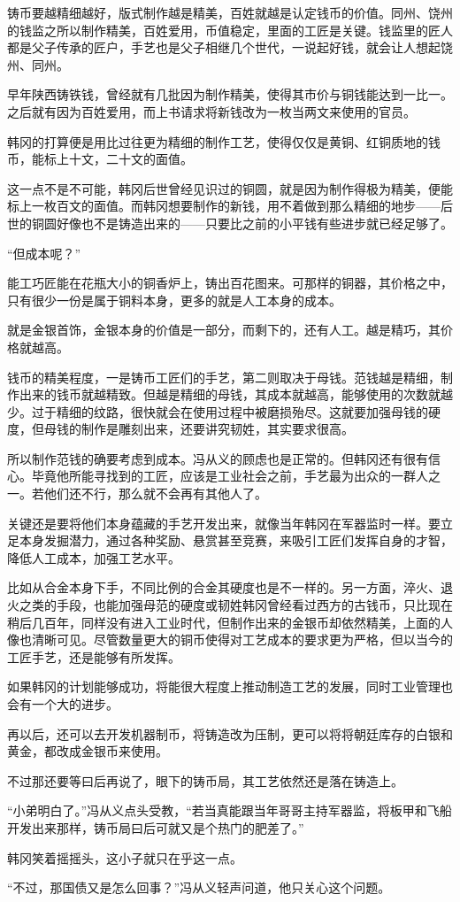 铸币要越精细越好，版式制作越是精美，百姓就越是认定钱币的价值。同州、饶州的钱监之所以制作精美，百姓爱用，币值稳定，里面的工匠是关键。钱监里的匠人都是父子传承的匠户，手艺也是父子相继几个世代，一说起好钱，就会让人想起饶州、同州。

早年陕西铸铁钱，曾经就有几批因为制作精美，使得其市价与铜钱能达到一比一。之后就有因为百姓爱用，而上书请求将新钱改为一枚当两文来使用的官员。

韩冈的打算便是用比过往更为精细的制作工艺，使得仅仅是黄铜、红铜质地的钱币，能标上十文，二十文的面值。

这一点不是不可能，韩冈后世曾经见识过的铜圆，就是因为制作得极为精美，便能标上一枚百文的面值。而韩冈想要制作的新钱，用不着做到那么精细的地步——后世的铜圆好像也不是铸造出来的——只要比之前的小平钱有些进步就已经足够了。

“但成本呢？”

能工巧匠能在花瓶大小的铜香炉上，铸出百花图来。可那样的铜器，其价格之中，只有很少一份是属于铜料本身，更多的就是人工本身的成本。

就是金银首饰，金银本身的价值是一部分，而剩下的，还有人工。越是精巧，其价格就越高。

钱币的精美程度，一是铸币工匠们的手艺，第二则取决于母钱。范钱越是精细，制作出来的钱币就越精致。但越是精细的母钱，其成本就越高，能够使用的次数就越少。过于精细的纹路，很快就会在使用过程中被磨损殆尽。这就要加强母钱的硬度，但母钱的制作是雕刻出来，还要讲究韧姓，其实要求很高。

所以制作范钱的确要考虑到成本。冯从义的顾虑也是正常的。但韩冈还有很有信心。毕竟他所能寻找到的工匠，应该是工业社会之前，手艺最为出众的一群人之一。若他们还不行，那么就不会再有其他人了。

关键还是要将他们本身蕴藏的手艺开发出来，就像当年韩冈在军器监时一样。要立足本身发掘潜力，通过各种奖励、悬赏甚至竞赛，来吸引工匠们发挥自身的才智，降低人工成本，加强工艺水平。

比如从合金本身下手，不同比例的合金其硬度也是不一样的。另一方面，淬火、退火之类的手段，也能加强母范的硬度或韧姓韩冈曾经看过西方的古钱币，只比现在稍后几百年，同样没有进入工业时代，但制作出来的金银币却依然精美，上面的人像也清晰可见。尽管数量更大的铜币使得对工艺成本的要求更为严格，但以当今的工匠手艺，还是能够有所发挥。

如果韩冈的计划能够成功，将能很大程度上推动制造工艺的发展，同时工业管理也会有一个大的进步。

再以后，还可以去开发机器制币，将铸造改为压制，更可以将将朝廷库存的白银和黄金，都改成金银币来使用。

不过那还要等曰后再说了，眼下的铸币局，其工艺依然还是落在铸造上。

“小弟明白了。”冯从义点头受教，“若当真能跟当年哥哥主持军器监，将板甲和飞船开发出来那样，铸币局曰后可就又是个热门的肥差了。”

韩冈笑着摇摇头，这小子就只在乎这一点。

“不过，那国债又是怎么回事？”冯从义轻声问道，他只关心这个问题。


